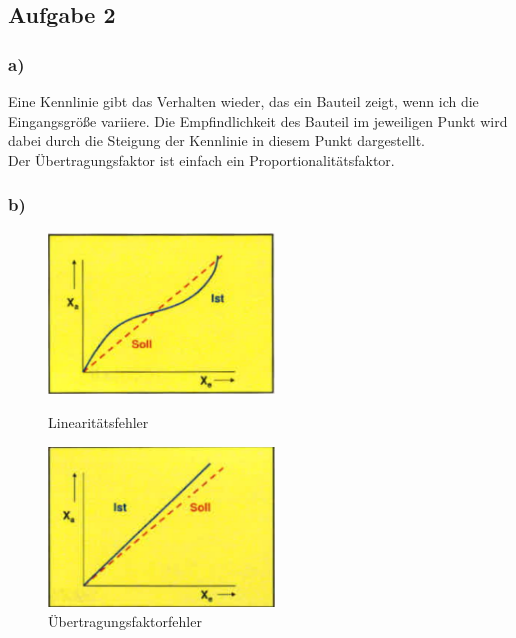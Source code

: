 \subsection{Aufgabe 2}

\subsubsection*{a)}

Eine Kennlinie gibt das Verhalten wieder, das ein Bauteil zeigt, wenn ich die Eingangsgröße variiere. Die Empfindlichkeit des Bauteil im jeweiligen Punkt wird dabei durch die Steigung der Kennlinie in diesem Punkt dargestellt. \\
Der Übertragungsfaktor ist einfach ein Proportionalitätsfaktor.


\newpage

\subsubsection*{b)}

\begin{center}
    \begin{figure}[h]
        \begin{minipage}[hbt]{7cm}
            \includegraphics[width=6cm]{Kl112b_1.png}
            \caption{Linearitätsfehler}
        \end{minipage}
        \begin{minipage}[hbt]{7cm}
            \includegraphics[width=6cm]{Kl112b_2.png}
            \caption{Übertragungsfaktorfehler}
        \end{minipage}
    \end{figure}
\end{center}

